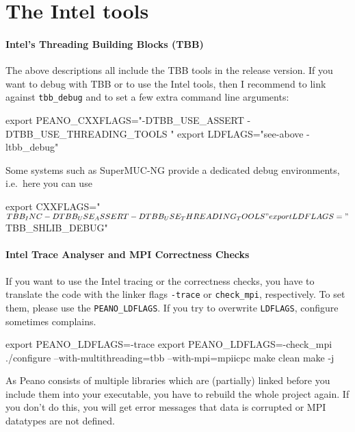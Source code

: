 \section{The Intel tools}
\label{section:supercomputers:IntelTools}

\paragraph{Intel's Threading Building Blocks (TBB)}

The above descriptions all include the TBB tools in the release version.
If you want to debug with TBB or to use the Intel tools, then I recommend to
link against \texttt{tbb\_debug} and to set a few extra command line arguments:

\begin{code}
 export PEANO_CXXFLAGS="-DTBB_USE_ASSERT -DTBB_USE_THREADING_TOOLS "
 export LDFLAGS="see-above   -ltbb_debug"
\end{code}

\noindent
Some systems such as SuperMUC-NG provide a dedicated debug environments,
i.e.~here you can use
\begin{code}
 export CXXFLAGS="$TBB_INC -DTBB_USE_ASSERT -DTBB_USE_THREADING_TOOLS "
 export LDFLAGS="$TBB_SHLIB_DEBUG"
\end{code}


\paragraph{Intel Trace Analyser and MPI Correctness Checks}

If you want to use the Intel tracing or the correctness checks, you have to
translate the code with the linker flags \texttt{-trace} or \texttt{check\_mpi},
respectively.
To set them, please use the \texttt{PEANO\_LDFLAGS}.
If you try to overwrite \texttt{LDFLAGS}, configure sometimes complains.


\begin{code}
 export PEANO_LDFLAGS=-trace
 export PEANO_LDFLAGS=-check_mpi
 ./configure --with-multithreading=tbb --with-mpi=mpiicpc
 make clean
 make -j
\end{code}


\noindent
As Peano consists of multiple libraries which are (partially) linked before you
include them into your executable, you have to rebuild the whole project again.
If you don't do this, you will get error messages that data is corrupted or MPI
datatypes are not defined.



